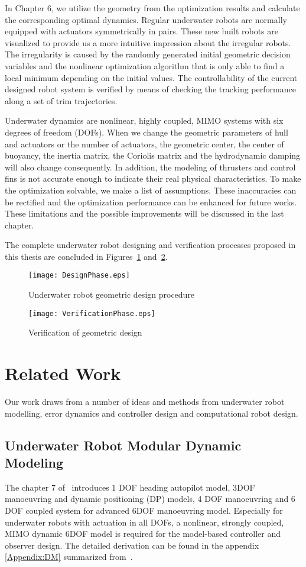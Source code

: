 In Chapter 6, we utilize the geometry from the optimization results and calculate the corresponding optimal dynamics. Regular underwater robots are normally equipped with actuators symmetrically in pairs. These new built robots are visualized to provide us a more intuitive impression about the irregular robots. The irregularity      is caused by the randomly generated initial geometric decision variables and the nonlinear optimization algorithm that is only able to find a local minimum depending on the initial values. The controllability of the current designed robot system is verified by means of checking the tracking performance along a set of trim trajectories. 

Underwater dynamics are nonlinear, highly coupled, MIMO systems with six degrees of freedom (DOFs). When we change
the geometric parameters of hull and actuators or the number of actuators, the geometric center, the center of buoyancy, the inertia matrix, the Coriolis matrix and the hydrodynamic damping will also change consequently. In addition, the modeling of thrusters and control fins is not accurate enough to indicate their real physical characteristics. To make the optimization solvable, we make a list of assumptions. These inaccuracies can be rectified and the optimization performance can be enhanced for future works. These limitations and the possible improvements will be discussed in the last chapter. 

The complete underwater robot designing and verification processes proposed in this thesis are concluded in Figures~\ref{FIG:DesignPhase} and~\ref{FIG:VerificationPhase}. 
\begin{figure}
\centering
\texttt{[image: DesignPhase.eps]}
\caption{Underwater robot geometric design procedure}	
\label{FIG:DesignPhase}
\end{figure}
\begin{figure}
\centering
\texttt{[image: VerificationPhase.eps]}
\caption{Verification of geometric design}	
\label{FIG:VerificationPhase}
\end{figure}
\section{Related Work}
Our work draws from a number of ideas and methods from underwater robot modelling, error dynamics and controller design and computational robot design.
\subsection{Underwater Robot Modular Dynamic Modeling}
The chapter 7 of~\cite{F2011} introduces 1 DOF heading autopilot model, 3DOF manoeuvring and dynamic positioning (DP) models, 4 DOF manoeuvring and 6 DOF coupled system for advanced 6DOF manoeuvring model. Especially for underwater robots with actuation in all DOFs, a nonlinear, strongly coupled, MIMO dynamic 6DOF model is required for the model-based controller and observer design. The detailed derivation can be found in the appendix \ref{Appendix:DM} summarized from~\cite{F2011,F1994,FF1995,AG2014}.


